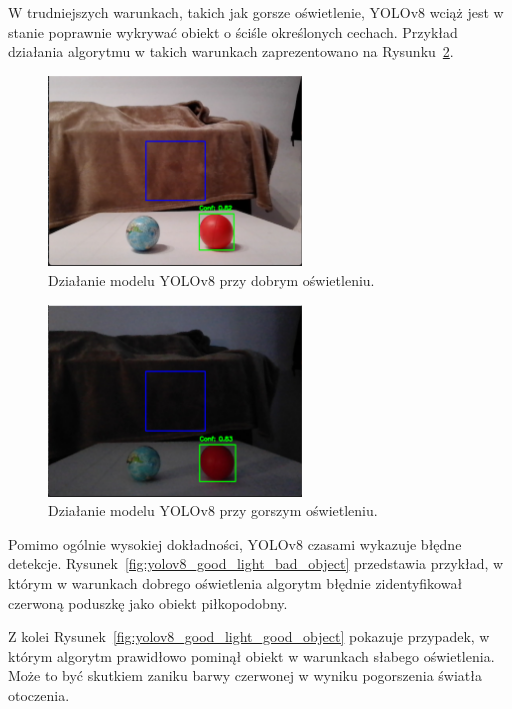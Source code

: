 \documentclass[a4paper,twoside,12pt]{book}
\begin{document}
W trudniejszych warunkach, takich jak gorsze oświetlenie, YOLOv8 wciąż jest w stanie poprawnie wykrywać obiekt o ściśle określonych cechach. Przykład działania algorytmu w takich warunkach zaprezentowano na Rysunku~\ref{fig:yolov8_bad_light}. 
\begin{figure}[h]
    \centering
    \includegraphics[width=0.6\textwidth]{Images/Porownanie/Yolo 8 laptop/Zrzut ekranu 2025-01-04 181013.png}
    \caption{Działanie modelu YOLOv8 przy dobrym oświetleniu.}
    \label{fig:yolov8_good_light}
\end{figure}

\begin{figure}[h]
    \centering
    \includegraphics[width=0.6\textwidth]{Images/Porownanie/Yolo 8 laptop/Zrzut ekranu 2025-01-04 181029.png}
    \caption{Działanie modelu YOLOv8 przy gorszym oświetleniu.}
    \label{fig:yolov8_bad_light}
\end{figure}
\newpage

Pomimo ogólnie wysokiej dokładności, YOLOv8 czasami wykazuje błędne detekcje. Rysunek~\ref{fig:yolov8_good_light_bad_object} przedstawia przykład, w którym w warunkach dobrego oświetlenia algorytm błędnie zidentyfikował czerwoną poduszkę jako obiekt piłkopodobny.

Z kolei Rysunek~\ref{fig:yolov8_good_light_good_object} pokazuje przypadek, w którym algorytm prawidłowo pominął obiekt w warunkach słabego oświetlenia. Może to być skutkiem zaniku barwy czerwonej w wyniku pogorszenia światła otoczenia.
\end{document}
